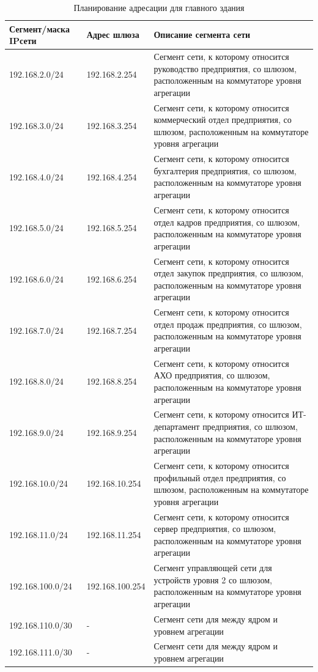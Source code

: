 \documentclass[14pt, a4paper]{extarticle}
\numberwithin{equation}{section}
\begin{document}
\begin{table}[H]
\centering
\small
\caption{Планирование адресации для главного здания}
\label{table:mainDepIpPlan}
\begin{tabular}{|m{4cm}|m{3cm}|m{8cm}|}
\hline
\textbf{Сегмент/маска IPсети} & \textbf{Адрес шлюза} & \textbf{Описание сегмента сети} \\
\hline
192.168.2.0/24 & 192.168.2.254 & Сегмент сети, к которому относится руководство предприятия, со шлюзом, расположенным на коммутаторе уровня агрегации
\\ \hline
192.168.3.0/24 & 192.168.3.254 & Сегмент сети, к которому относится коммерческий отдел предприятия, со шлюзом, расположенным на коммутаторе уровня агрегации
\\ \hline
192.168.4.0/24 & 192.168.4.254 & Сегмент сети, к которому относится бухгалтерия предприятия, со шлюзом, расположенным на коммутаторе уровня агрегации
\\ \hline
192.168.5.0/24 & 192.168.5.254 & Сегмент сети, к которому относится отдел кадров предприятия, со шлюзом, расположенным на коммутаторе уровня агрегации
\\ \hline
192.168.6.0/24 & 192.168.6.254 & Сегмент сети, к которому относится отдел закупок предприятия, со шлюзом, расположенным на коммутаторе уровня агрегации
\\ \hline
192.168.7.0/24 & 192.168.7.254 & Сегмент сети, к которому относится отдел продаж предприятия, со шлюзом, расположенным на коммутаторе уровня агрегации
\\ \hline
192.168.8.0/24 & 192.168.8.254 & Сегмент сети, к которому относится АХО предприятия, со шлюзом, расположенным на коммутаторе уровня агрегации
\\ \hline
192.168.9.0/24 & 192.168.9.254 & Сегмент сети, к которому относится ИТ-департамент предприятия, со шлюзом, расположенным на коммутаторе уровня агрегации
\\ \hline
192.168.10.0/24 & 192.168.10.254 & Сегмент сети, к которому относится профильный отдел предприятия, со шлюзом, расположенным на коммутаторе уровня агрегации
\\ \hline
192.168.11.0/24 & 192.168.11.254 & Сегмент сети, к которому относится сервер предприятия, со шлюзом, расположенным на коммутаторе уровня агрегации
\\ \hline
192.168.100.0/24 & 192.168.100.254 & Сегмент управляющей сети для устройств уровня 2 со шлюзом, расположенным на коммутаторе уровня агрегации 
\\ \hline
192.168.110.0/30 & - & Сегмент сети для между ядром и уровнем агрегации
\\ \hline
192.168.111.0/30 & - & Сегмент сети для между ядром и уровнем агрегации
\\ \hline
\end{tabular}
\end{table}
\end{document}
